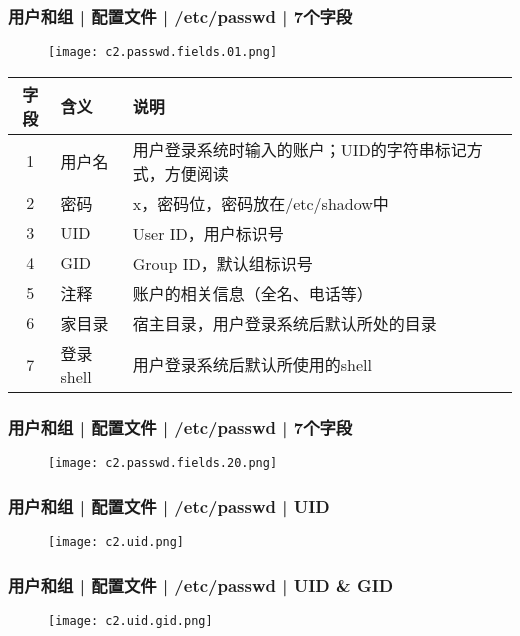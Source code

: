 \begin{frame}
  \frametitle{用户和组 | 配置文件 | /etc/passwd | \alert{7个字段}}
  \vspace{-0.5cm}
  \begin{figure}
    \centering
    \texttt{[image: c2.passwd.fields.01.png]}
  \end{figure}
  \pause
  \vspace{-0.5cm}
  \begin{table}
    \centering
    \begin{tabularx}{\textwidth}{clX}
      \hline
      \rowcolor{blue!50}字段 & 含义 & 说明\\
      \hline
      1 & 用户名 & 用户登录系统时输入的账户；UID的字符串标记方式，方便阅读\\
      2 & 密码 & x，密码位，密码放在/etc/shadow中\\
      3 & UID & User ID，用户标识号\\
      4 & GID & Group ID，默认组标识号\\
      5 & 注释 & 账户的相关信息（全名、电话等）\\
      6 & 家目录 & 宿主目录，用户登录系统后默认所处的目录\\
      7 & 登录shell & 用户登录系统后默认所使用的shell\\
      \hline
    \end{tabularx}
  \end{table}
\end{frame}

\begin{frame}
  \frametitle{用户和组 | 配置文件 | /etc/passwd | 7个字段}
  \begin{figure}
    \centering
    \texttt{[image: c2.passwd.fields.20.png]}
  \end{figure}
\end{frame}

\begin{frame}
  \frametitle{用户和组 | 配置文件 | /etc/passwd | UID}
  \begin{figure}
    \centering
    \texttt{[image: c2.uid.png]}
  \end{figure}
\end{frame}

\begin{frame}
  \frametitle{用户和组 | 配置文件 | /etc/passwd | UID \& GID}
  \begin{figure}
    \centering
    \texttt{[image: c2.uid.gid.png]}
  \end{figure}
\end{frame}


